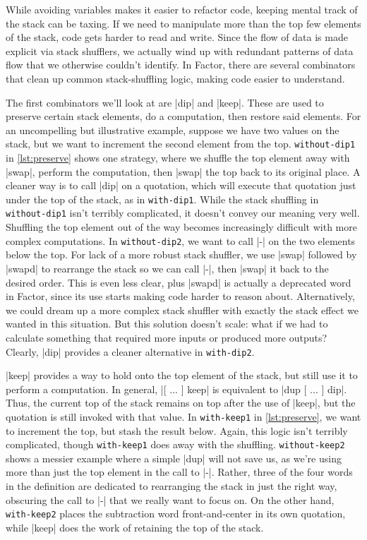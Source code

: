 While avoiding variables makes it easier to refactor code, keeping mental track
of the stack can be taxing.  If we need to manipulate more than the top few
elements of the stack, code gets harder to read and write.  Since the flow of
data is made explicit via stack shufflers, we actually wind up with redundant
patterns of data flow that we otherwise couldn't identify.  In Factor, there
are several combinators that clean up common stack-shuffling logic, making code
easier to understand.

The first combinators we'll look at are \factor|dip| and \factor|keep|.  These
are used to preserve certain stack elements, do a computation, then restore
said elements.  For an uncompelling but illustrative example, suppose we have
two values on the stack, but we want to increment the second element from the
top.  \Verb|without-dip1| in \vref{lst:preserve} shows one strategy, where we
shuffle the top element away with \factor|swap|, perform the computation, then
\factor|swap| the top back to its original place.  A cleaner way is to call
\factor|dip| on a quotation, which will execute that quotation just under the
top of the stack, as in \Verb|with-dip1|.  While the stack shuffling in
\Verb|without-dip1| isn't terribly complicated, it doesn't convey our meaning
very well.  Shuffling the top element out of the way becomes increasingly
difficult with more complex computations.  In \Verb|without-dip2|, we want to
call \factor|-| on the two elements below the top.  For lack of a more robust
stack shuffler, we use \factor|swap| followed by \factor|swapd| to rearrange
the stack so we can call \factor|-|, then \factor|swap| it back to the desired
order.  This is even less clear, plus \factor|swapd| is actually a deprecated
word in Factor, since its use starts making code harder to reason about.
Alternatively, we could dream up a more complex stack shuffler with exactly the
stack effect we wanted in this situation.  But this solution doesn't scale:
what if we had to calculate something that required more inputs or produced
more outputs?  Clearly, \factor|dip| provides a cleaner alternative in
\Verb|with-dip2|.


\factor|keep| provides a way to hold onto the top element of the stack, but
still use it to perform a computation.  In general,
%
\factor|[ ... ] keep|
%
is equivalent to
%
\factor|dup [ ... ] dip|.
%
Thus, the current top of the stack remains on top after the use of
\factor|keep|, but the quotation is still invoked with that value.  In
\Verb|with-keep1| in \vref{lst:preserve}, we want to increment the top, but
stash the result below.  Again, this logic isn't terribly complicated, though
\Verb|with-keep1| does away with the shuffling.  \Verb|without-keep2| shows a
messier example where a simple \factor|dup| will not save us, as we're using
more than just the top element in the call to \factor|-|.  Rather, three of the
four words in the definition are dedicated to rearranging the stack in just the
right way, obscuring the call to \factor|-| that we really want to focus on.
On the other hand, \Verb|with-keep2| places the subtraction word
front-and-center in its own quotation, while \factor|keep| does the work of
retaining the top of the stack.

